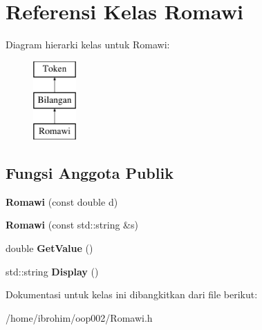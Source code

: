\hypertarget{classRomawi}{}\section{Referensi Kelas Romawi}
\label{classRomawi}
Diagram hierarki kelas untuk Romawi\+:\begin{figure}[H]
\begin{center}
\leavevmode
\includegraphics[height=3.000000cm]{d9/de3/classRomawi}
\end{center}
\end{figure}
\subsection*{Fungsi Anggota Publik}
\begin{DoxyCompactItemize}
\item 
\hypertarget{classRomawi_ad246367c51d3d67d4fbaaee36031ccd1}{}{\bfseries Romawi} (const double d)\label{classRomawi_ad246367c51d3d67d4fbaaee36031ccd1}

\item 
\hypertarget{classRomawi_a46332c134c2f38feb7787994bd99e3ad}{}{\bfseries Romawi} (const std\+::string \&s)\label{classRomawi_a46332c134c2f38feb7787994bd99e3ad}

\item 
\hypertarget{classRomawi_adc5a0a8e2ad13902f66da32e5ebe2bfe}{}double {\bfseries Get\+Value} ()\label{classRomawi_adc5a0a8e2ad13902f66da32e5ebe2bfe}

\item 
\hypertarget{classRomawi_a630b1a4635acfaa7a3def12b5a6aaecc}{}std\+::string {\bfseries Display} ()\label{classRomawi_a630b1a4635acfaa7a3def12b5a6aaecc}

\end{DoxyCompactItemize}


Dokumentasi untuk kelas ini dibangkitkan dari file berikut\+:\begin{DoxyCompactItemize}
\item 
/home/ibrohim/oop002/Romawi.\+h\end{DoxyCompactItemize}
